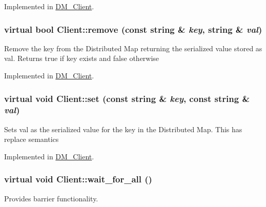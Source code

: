 Implemented in \hyperlink{class_d_m___client_a8285b5edb01bfe9325d887a4bb4e17d7}{DM\_\-Client}.

\hypertarget{class_client_ac60bd2cf7928c64a662fa8c0af748d0c}{
\subsubsection[{remove}]{\setlength{\rightskip}{0pt plus 5cm}virtual bool Client::remove (const string \& {\em key}, \/  string \& {\em val})}}
\label{class_client_ac60bd2cf7928c64a662fa8c0af748d0c}
Remove the key from the Distributed Map returning the serialized value stored as val. Returns true if key exists and false otherwise 

Implemented in \hyperlink{class_d_m___client_a856f11737f8dce9f842256a3391b084b}{DM\_\-Client}.

\hypertarget{class_client_a5efb1076768c93a53355bc7bdc8b430f}{
\subsubsection[{set}]{\setlength{\rightskip}{0pt plus 5cm}virtual void Client::set (const string \& {\em key}, \/  const string \& {\em val})}}
\label{class_client_a5efb1076768c93a53355bc7bdc8b430f}
Sets val as the serialized value for the key in the Distributed Map. This has replace semantics 

Implemented in \hyperlink{class_d_m___client_aebf92e20f8ae0517bee2c956593f3748}{DM\_\-Client}.

\hypertarget{class_client_af1bfd186c6afcddd19e0e6f69e1a8fc1}{
\subsubsection[{wait\_\-for\_\-all}]{\setlength{\rightskip}{0pt plus 5cm}virtual void Client::wait\_\-for\_\-all ()}}
\label{class_client_af1bfd186c6afcddd19e0e6f69e1a8fc1}


Provides barrier functionality. 



